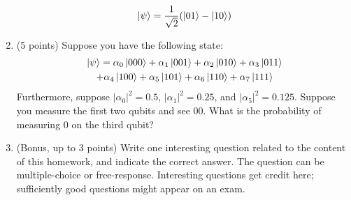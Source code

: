 \documentclass[12pt]{article}
\begin{document}
\begin{enumerate}[font=\bfseries]
    \[\ket{\psi} = \frac{1}{\sqrt{2}}(\ket{01}-\ket{10})\]
    \item (5 points) Suppose you have the following state:
    \begin{multline} \ket{\psi} = 
        \alpha_0\ket{000} + \alpha_1\ket{001} +
                    \alpha_2\ket{010} + \alpha_3\ket{011}  \\
                    + \alpha_4\ket{100} + \alpha_5\ket{101} +
                    \alpha_6\ket{110} + \alpha_7\ket{111}
    \end{multline}
    Furthermore, suppose $|\alpha_0|^2 = 0.5$, $|\alpha_1|^2 = 0.25$, and $|\alpha_5|^2 = 0.125$. Suppose you measure the first two qubits and see $00$. What is the probability of measuring 0 on the third qubit?
    \item (Bonus, up to 3 points) Write one interesting question related to the content of this homework, and indicate the correct answer. The question can be multiple-choice or free-response.  Interesting questions get credit here;  sufficiently good questions might appear on an exam.
\end{enumerate}
\end{document}
